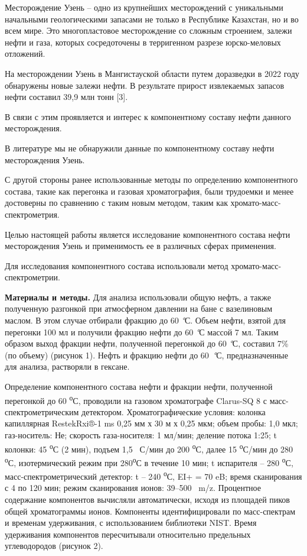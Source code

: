 Месторождение Узень -- одно из крупнейших месторождений с уникальными
начальными геологическими запасами не только в Республике Казахстан, но
и во всем мире. Это многопластовое месторождение со сложным строением,
залежи нефти и газа, которых сосредоточены в терригенном разрезе
юрско-меловых отложений.

На месторождении Узень в Мангистауской области путем доразведки в 2022
году обнаружены новые залежи нефти. В результате прирост извлекаемых
запасов нефти составил 39,9 млн тонн {[}3{]}.

В связи с этим проявляется и интерес к компонентному составу нефти
данного месторождения.

В литературе мы не обнаружили данные по компонентному составу нефти
месторождения Узень.

С другой стороны ранее использованные методы по определению
компонентного состава, такие как перегонка и газовая хроматография, были
трудоемки и менее достоверны по сравнению с таким новым методом, таким
как хромато-масс-спектрометрия.

Целью настоящей работы является исследование компонентного состава нефти
месторождения Узень и применимость ее в различных сферах применения.

Для исследования компонентного состава использовали метод
хромато-масс-спектрометрии.

{\bfseries Материалы и методы.} Для анализа использовали общую нефть, а
также полученную разгонкой при атмосферном давлении на бане с
вазелиновым маслом. В этом случае отбирали фракцию до 60 \emph{°}С.
Объем нефти, взятой для перегонки 100 мл и получили фракцию нефти до 60
\emph{°}С массой 7 мл. Таким образом выход фракции нефти, полученной
перегонкой до 60 \emph{°}С, составил 7\% (по объему) (рисунок 1). Нефть
и фракцию нефти до 60~\emph{°}С, предназначенные для анализа, растворяли
в гексане.

Определение компонентного состава нефти и фракции нефти, полученной
перегонкой до 60 \textsuperscript{о}С, проводили на газовом хроматографе
Clarus-SQ 8 с масс-спектрометрическим детектором. Хроматографические
условия: колонка капиллярная RestekRxi®-1 ms 0,25 мм х 30 м х 0,25 мкм;
объем пробы: 1,0 мкл; газ-носитель: Не; скорость газа-носителя: 1
мл/мин; деление потока 1:25; t колонки: 45 \textsuperscript{о}С (2 мин),
подъем 1,5 ~С/мин до 200 \textsuperscript{о}С, далее 15
\textsuperscript{о}С/мин до 280 \textsuperscript{о}С, изотермический
режим при 280\textsuperscript{о}С в течение 10 мин; t испарителя -- 280
\textsuperscript{о}С, масс-спектрометрический детектор: t -- 240
\textsuperscript{о}С, EI+ = 70 eB; время сканирования с 4 по 120 мин;
режим сканирования ионов: 39--500 ~m/z. Процентное содержание
компонентов вычисляли автоматически, исходя из площадей пиков общей
хроматограммы ионов. Компоненты идентифицировали по масс-спектрам и
временам удерживания, с использованием библиотеки NIST. Время
удерживания компонентов пересчитывали относительно предельных
углеводородов (рисунок 2).

